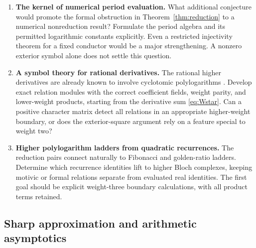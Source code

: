 \documentclass[11pt]{article}
\numberwithin{equation}{section}
\theoremstyle{definition}
\theoremstyle{remark}
\begin{document}
\begin{enumerate}[resume]
\item \textbf{The kernel of numerical period evaluation.}
      What additional conjecture would promote the formal
      obstruction in Theorem~\ref{thm:reduction} to a numerical
      nonreduction result? Formulate the period algebra and its
      permitted logarithmic constants explicitly. Even a restricted
      injectivity theorem for a fixed conductor would be a major
      strengthening. A nonzero exterior symbol alone does not
      settle this question.

\item \textbf{A symbol theory for rational derivatives.}
      The rational higher derivatives are already known to
      involve cyclotomic polylogarithms \cite[\S4]{RZ}.
      Develop exact relation modules with the correct coefficient
      fields, weight parity, and lower-weight products, starting
      from the derivative sum \eqref{eq:Wstar}. Can a positive
      character matrix detect all relations in an appropriate
      higher-weight boundary, or does the exterior-square
      argument rely on a feature special to weight two?

\item \textbf{Higher polylogarithm ladders from quadratic recurrences.}
      The reduction pairs connect naturally to Fibonacci and
      golden-ratio ladders. Determine which recurrence identities
      lift to higher Bloch complexes, keeping motivic or formal
      relations separate from evaluated real identities. The
      first goal should be explicit weight-three boundary
      calculations, with all product terms retained.
\end{enumerate}

\subsection{Sharp approximation and arithmetic asymptotics}
\end{document}
